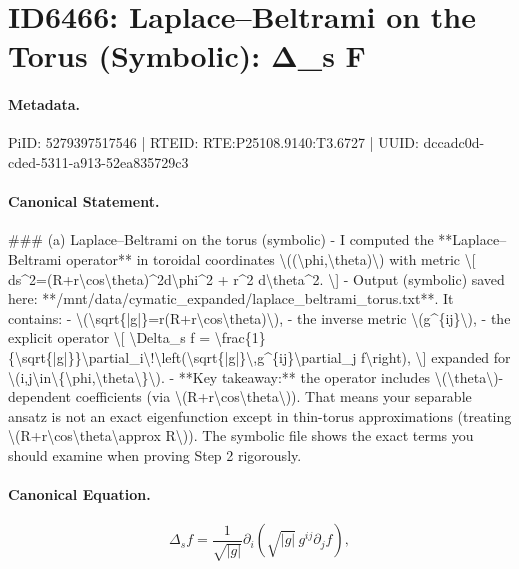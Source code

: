 \section*{ID6466: Laplace–Beltrami on the Torus (Symbolic): Δ\_s F}
\paragraph{Metadata.}
PiID: 5279397517546 | RTEID: RTE:P25108.9140:T3.6727 | UUID: dccadc0d-cded-5311-a913-52ea835729c3

\paragraph{Canonical Statement.}
\#\#\# (a) Laplace–Beltrami on the torus (symbolic) - I computed the **Laplace–Beltrami operator** in toroidal coordinates \textbackslash{}((\textbackslash{}phi,\textbackslash{}theta)\textbackslash{}) with metric \textbackslash{}[ ds\textasciicircum{}2=(R+r\textbackslash{}cos\textbackslash{}theta)\textasciicircum{}2d\textbackslash{}phi\textasciicircum{}2 + r\textasciicircum{}2 d\textbackslash{}theta\textasciicircum{}2. \textbackslash{}] - Output (symbolic) saved here: **/mnt/data/cymatic\_expanded/laplace\_beltrami\_torus.txt**. It contains: - \textbackslash{}(\textbackslash{}sqrt\{|g|\}=r(R+r\textbackslash{}cos\textbackslash{}theta)\textbackslash{}), - the inverse metric \textbackslash{}(g\textasciicircum{}\{ij\}\textbackslash{}), - the explicit operator \textbackslash{}[ \textbackslash{}Delta\_s f = \textbackslash{}frac\{1\}\{\textbackslash{}sqrt\{|g|\}\}\textbackslash{}partial\_i\textbackslash{}!\textbackslash{}left(\textbackslash{}sqrt\{|g|\}\textbackslash{},g\textasciicircum{}\{ij\}\textbackslash{}partial\_j f\textbackslash{}right), \textbackslash{}] expanded for \textbackslash{}(i,j\textbackslash{}in\textbackslash{}\{\textbackslash{}phi,\textbackslash{}theta\textbackslash{}\}\textbackslash{}). - **Key takeaway:** the operator includes \textbackslash{}(\textbackslash{}theta\textbackslash{})-dependent coefficients (via \textbackslash{}(R+r\textbackslash{}cos\textbackslash{}theta\textbackslash{})). That means your separable ansatz is not an exact eigenfunction except in thin-torus approximations (treating \textbackslash{}(R+r\textbackslash{}cos\textbackslash{}theta\textbackslash{}approx R\textbackslash{})). The symbolic file shows the exact terms you should examine when proving Step 2 rigorously.

\paragraph{Canonical Equation.}
\[
\Delta_s f = \frac{1}{\sqrt{|g|}}\partial_i\!\left(\sqrt{|g|}\,g^{ij}\partial_j f\right),
\]

